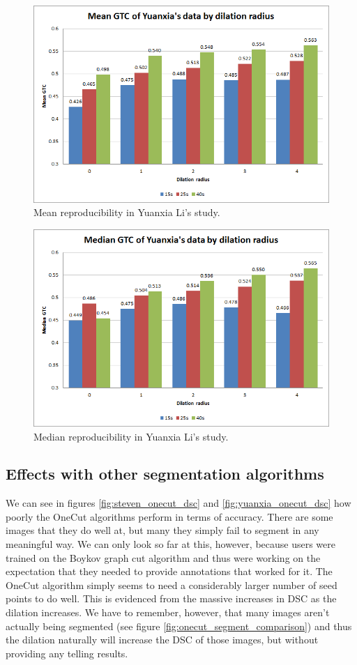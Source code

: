 \documentclass[12pt,a4paper,notitlepage]{article}
\begin{document}
\begin{figure}[H]
	\includegraphics[width=.9\linewidth]{yuanxia_mean_gtc}
	\caption{Mean reproducibility in Yuanxia Li's study.}
	\label{fig:yuanxia_mean_gtc}
\end{figure}

\begin{figure}[H]
	\includegraphics[width=.9\linewidth]{yuanxia_median_gtc}
	\caption{Median reproducibility in Yuanxia Li's study.}
	\label{fig:yuanxia_median_gtc}
\end{figure}

\subsection{Effects with other segmentation algorithms}
We can see in figures \ref{fig:steven_onecut_dsc} and \ref{fig:yuanxia_onecut_dsc} how poorly the OneCut algorithms perform in terms of accuracy. There are some images that they do well at, but many they simply fail to segment in any meaningful way. We can only look so far at this, however, because users were trained on the Boykov graph cut algorithm and thus were working on the expectation that they needed to provide annotations that worked for it. The OneCut algorithm simply seems to need a considerably larger number of seed points to do well. This is evidenced from the massive increases in DSC as the dilation increases. We have to remember, however, that many images aren't actually being segmented (see figure \ref{fig:onecut_segment_comparison}) and thus the dilation naturally will increase the DSC of those images, but without providing any telling results.
\end{document}
